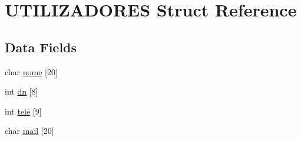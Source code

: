 \hypertarget{struct_u_t_i_l_i_z_a_d_o_r_e_s}{\section{U\+T\+I\+L\+I\+Z\+A\+D\+O\+R\+E\+S Struct Reference}
\label{struct_u_t_i_l_i_z_a_d_o_r_e_s}
}
\subsection*{Data Fields}
\begin{DoxyCompactItemize}
\item 
char \hyperlink{struct_u_t_i_l_i_z_a_d_o_r_e_s_a9ccb3b1009c0baf8e49e38488c83732a}{nome} \mbox{[}20\mbox{]}
\item 
int \hyperlink{struct_u_t_i_l_i_z_a_d_o_r_e_s_a028f83b677cad53aa15461fe81de4962}{dn} \mbox{[}8\mbox{]}
\item 
int \hyperlink{struct_u_t_i_l_i_z_a_d_o_r_e_s_a423ca1da39ebd30724400f2fb097c2ea}{tele} \mbox{[}9\mbox{]}
\item 
char \hyperlink{struct_u_t_i_l_i_z_a_d_o_r_e_s_acc4eee01753a98abe33ff84932394203}{mail} \mbox{[}20\mbox{]}
\end{DoxyCompactItemize}


